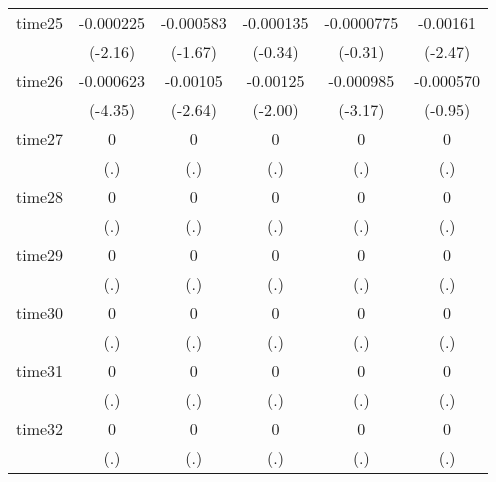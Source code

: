 \begin{table}[htbp]
\begin{tabular}{l*{5}{c}}
time25      &   -0.000225\sym{*}  &   -0.000583         &   -0.000135         &  -0.0000775         &    -0.00161\sym{*}  \\
            &     (-2.16)         &     (-1.67)         &     (-0.34)         &     (-0.31)         &     (-2.47)         \\
time26      &   -0.000623\sym{***}&    -0.00105\sym{**} &    -0.00125\sym{*}  &   -0.000985\sym{**} &   -0.000570         \\
            &     (-4.35)         &     (-2.64)         &     (-2.00)         &     (-3.17)         &     (-0.95)         \\
time27      &           0         &           0         &           0         &           0         &           0         \\
            &         (.)         &         (.)         &         (.)         &         (.)         &         (.)         \\
time28      &           0         &           0         &           0         &           0         &           0         \\
            &         (.)         &         (.)         &         (.)         &         (.)         &         (.)         \\
time29      &           0         &           0         &           0         &           0         &           0         \\
            &         (.)         &         (.)         &         (.)         &         (.)         &         (.)         \\
time30      &           0         &           0         &           0         &           0         &           0         \\
            &         (.)         &         (.)         &         (.)         &         (.)         &         (.)         \\
time31      &           0         &           0         &           0         &           0         &           0         \\
            &         (.)         &         (.)         &         (.)         &         (.)         &         (.)         \\
time32      &           0         &           0         &           0         &           0         &           0         \\
            &         (.)         &         (.)         &         (.)         &         (.)         &         (.)         \\

\end{tabular}
\end{table}
